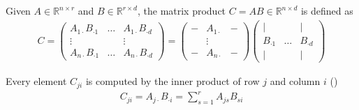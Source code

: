 \documentclass[letterpaper,10pt,english]{jupyterBook}
\begin{document}
\sphinxAtStartPar
Given \(A\in \mathbb{R}^{n\times r}\) and \(B\in\mathbb{R}^{r\times d}\), the matrix product \(C=AB\in\mathbb{R}^{n\times d}\) is defined as
\begin{equation*}
\begin{split}C= \begin{pmatrix} A_{1\cdot}B_{\cdot 1}&\ldots & A_{1\cdot}B_{\cdot d}\\
\vdots & & \vdots\\ A_{n\cdot}B_{\cdot 1}&\ldots & A_{n\cdot}B_{\cdot d} \end{pmatrix} = \begin{pmatrix}-&A_{1\cdot}&-\\&\vdots&\\-&A_{n\cdot}&-\end{pmatrix} \begin{pmatrix} \vert& & \vert\\ B_{\cdot 1}&\ldots&B_{\cdot d}\\\vert& & \vert \end{pmatrix}\end{split}
\end{equation*}

\sphinxAtStartPar
Every element \(C_{ji}\) is computed by the inner product of row \(j\) and column \(i\) ()
\begin{equation*}
\begin{split}C_{ji}=A_{j\cdot}B_{\cdot i} = \sum_{s=1}^r A_{js}B_{si}\end{split}
\end{equation*}
\end{document}
